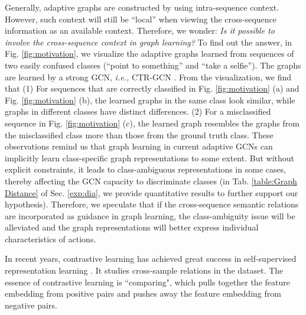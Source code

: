 \documentclass{article} \usepackage{iclr2023_conference,times}
\begin{document}
Generally, adaptive graphs are constructed by using intra-sequence context. However, such context will still be ``local'' when viewing the cross-sequence information as an available context. Therefore, we wonder: \textit{Is it possible to involve the cross-sequence context in graph learning?} To find out the answer, in Fig. \ref{fig:motivation}, we visualize the adaptive graphs learned from sequences of two easily confused classes (``point to something'' and ``take a selfie''). The graphs are learned by a strong GCN, \emph{i.e.,} CTR-GCN \citep{CTRGCN}. From the visualization, we find that 
(1) For sequences that are correctly classified in Fig. \ref{fig:motivation} (a) and Fig. \ref{fig:motivation} (b), the learned graphs in the same class look similar, while graphs in different classes have distinct differences. (2) For a misclassified sequence in Fig. \ref{fig:motivation} (c), the learned graph resembles the graphs from the misclassified class more than those from the ground truth class. These observations remind us that graph learning in current adaptive GCNs can implicitly learn class-specific graph representations to some extent. But without explicit constraints, it leads to class-ambiguous representations in some cases, thereby affecting the GCN capacity to discriminate classes (in Tab. \ref{table:Graph Distance} of Sec. \ref{exp:dia}, we provide quantitative results to further support our hypothesis). Therefore, we speculate that if the cross-sequence semantic relations are incorporated as guidance in graph learning, the class-ambiguity issue will be alleviated and the graph representations will better express individual characteristics of actions.



In recent years, contrastive learning has achieved great success in self-supervised representation learning \citep{moco, simclr, mocov3}. It studies cross-sample relations in the dataset. The essence of contrastive learning is ``comparing", which pulls together the feature embedding from positive pairs and pushes away the feature embedding from negative pairs.
\end{document}
